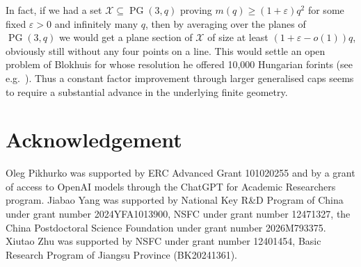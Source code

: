 \documentclass[10pt,a4paper]{article}
\numberwithin{equation}{section}
\theoremstyle{definition}
\theoremstyle{remark}
\newcommand{\hide}[1]{{\color{DarkGreen}#1}}
\renewcommand{\hide}[1]{}
\begin{document}
 \hide{Some details:
 	Hill~\cite{Hill78} improved it to $2q^2-\alpha_q$ where $\alpha_q$ comes from an explicit (but messy) inequality and is linear in $q$, specifically he showed that
 	\begin{equation}\label{eq:H4-Hill-bound}
 		m(q)\le2q^2-\frac{\sqrt{17}-3}{2}\,q+O(1)
 		\quad(q\to\infty);
 	\end{equation}
 	
 	
 	In the other direction, results on cubic surfaces imply
 	\begin{equation}\label{eq:H4-cubic-cap}
 		m(q)\ge(q+1)^2
 		\quad\text{for every prime power }q.
 	\end{equation}
 	To see this, Theorem~1.1 of Loughran and Trepalin~\cite{LoughranTrepalin20} gives a smooth cubic surface $\mathcal X$ of Frobenius class $C_{12}$ over every $\mathbb F_q$. The point-count formula and Table~7.1 of Banwait, Fit\'e and Loughran~\cite{BanwaitFiteLoughran19} give $| \mathcal X(\mathbb F_q)|=q^2+2q+1$. The same table gives Frobenius orbits of lengths $3,6,6,6,6$ on its 27 geometric lines, so none of these lines is defined over $\mathbb F_q$. Restricting the defining homogeneous cubic to any $\mathbb F_q$-line therefore gives a non-zero homogeneous binary cubic, which has at most three projective zeros. Thus $ \mathcal X(\mathbb F_q)\subseteq\operatorname{PG}(3,q)$ has no four collinear points, proving~\eqref{eq:H4-cubic-cap}.
 }%
 
 
In fact, if we had a set $ \mathcal X\subseteq \operatorname{PG}(3,q)$ proving $m(q)\ge (1+\varepsilon)q^2$ for some fixed $\varepsilon>0$ and infinitely many $q$, then by averaging over the planes of $\operatorname{PG}(3,q)$ we would get a plane section of $ \mathcal X$ of size at least $(1+\varepsilon-o(1))q$, obviously still
without any four points on a line. This would settle an open problem of Blokhuis for whose resolution he offered 10,000 Hungarian forints (see e.g.~\cite[Section 5, Problem 2]{BallHirschfeld05}).  Thus a constant factor improvement through larger generalised caps seems to require a substantial advance in the underlying finite geometry.





\section*{Acknowledgement}
\noindent 
Oleg Pikhurko was supported 
by ERC Advanced Grant 101020255 and by a grant of access to OpenAI models through the ChatGPT for Academic Researchers program.
Jiabao Yang was supported by National Key R\&D Program of China under grant number 2024YFA1013900, 
NSFC under grant number 12471327, the China Postdoctoral Science Foundation under grant number 2026M793375.
Xiutao Zhu was supported by NSFC under grant number 12401454, Basic Research Program of Jiangsu Province (BK20241361).
\end{document}
